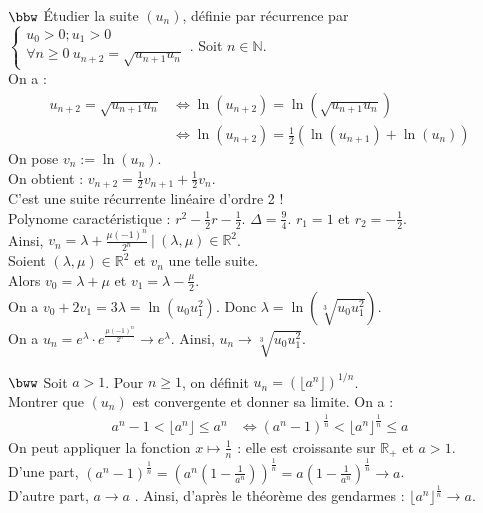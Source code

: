 \documentclass[11pt]{article}
\begin{document}
\begin{exercice}{$\bbw$}{}
    Étudier la suite $(u_n)$, définie par récurrence par $\begin{cases}
        u_0 > 0; u_1 > 0\\
        \forall n \geq 0 ~ u_{n+2} = \sqrt{u_{n+1}u_n}
    \end{cases}$.
    \tcblower
    Soit $n\in\mathbb{N}$.\\
    On a :
    \begin{align*}
        u_{n+2} = \sqrt{u_{n+1}u_n} &\iff \ln(u_{n+2}) = \ln(\sqrt{u_{n+1}u_n})\\
        &\iff \ln(u_{n+2}) = \frac{1}{2}(\ln(u_{n+1}) + \ln(u_n))
    \end{align*}
    On pose $v_n := \ln(u_n)$.\\
    On obtient : $v_{n+2} = \frac{1}{2}v_{n+1} + \frac{1}{2}v_n$.\\
    C'est une suite récurrente linéaire d'ordre 2 !\\
    Polynome caractéristique : $r^2 - \frac{1}{2}r - \frac{1}{2}$. $\Delta = \frac{9}{4}$. $r_1 = 1$ et $r_2 = -\frac{1}{2}$.\\
    Ainsi, $v_n = \lambda + \frac{\mu(-1)^n}{2^n} ~ | ~ (\lambda, \mu)\in\mathbb{R}^2$.\\
    Soient $(\lambda,\mu)\in\mathbb{R}^2$ et $v_n$ une telle suite.\\
    Alors $v_0 = \lambda + \mu$ et $v_1 = \lambda - \frac{\mu}{2}$.\\
    On a $v_0 + 2v_1 = 3\lambda = \ln(u_0u_1^2)$. Donc $\lambda = \ln(\sqrt[3]{u_0u_1^2})$.\\
    On a $u_n = e^\lambda \cdot e^{\frac{\mu(-1)^n}{2^n}} \to e^{\lambda}$. Ainsi, $u_n \to \sqrt[3]{u_0u_1^2}$.
\end{exercice}

\begin{exercice}{$\bww$}{}
    Soit $a>1$. Pour $n\geq1$, on définit $u_n=(\lfloor a^n \rfloor)^{1/n}$.\\
    Montrer que $(u_n)$ est convergente et donner sa limite.
    \tcblower
    On a :
    \begin{align*}
        a^n - 1 < \lfloor a^n \rfloor \leq a^n &\iff (a^n - 1)^{\frac{1}{n}} < \lfloor a^n \rfloor ^ \frac{1}{n} \leq a
    \end{align*}
    On peut appliquer la fonction $x\mapsto \frac{1}{n}$ : elle est croissante sur $\mathbb{R}_+$ et $a>1$.\\
    D'une part, $(a^n - 1)^{\frac{1}{n}} = (a^n(1 - \frac{1}{a^n}))^{\frac{1}{n}} = a(1-\frac{1}{a^n})^\frac{1}{n} \to a$.\\
    D'autre part, $a \to a$ \cmark.
    Ainsi, d'après le théorème des gendarmes : $\lfloor a^n \rfloor ^ \frac{1}{n} \to a$.
\end{exercice}
\end{document}
